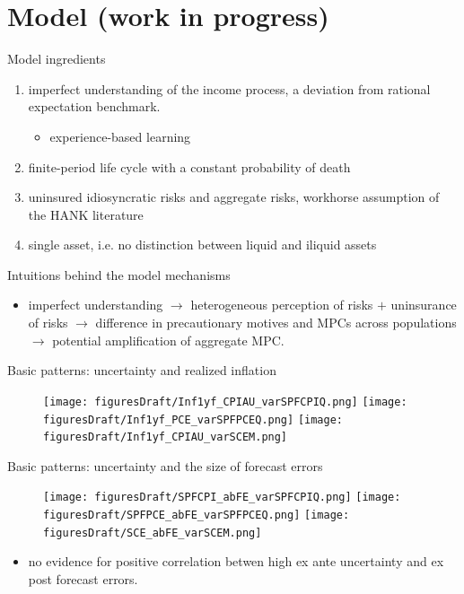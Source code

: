 \documentclass{beamer}
\begin{document}
\section{Model (work in progress)}

\begin{frame}{Model ingredients}

\begin{enumerate}
	\item imperfect understanding of the income process, a deviation from rational expectation benchmark. 
	\begin{itemize}
		\item experience-based learning 
	\end{itemize}
\item finite-period life cycle with a constant probability of death 
\item uninsured idiosyncratic risks and aggregate risks, workhorse assumption of the HANK literature
\item single asset, i.e. no distinction between liquid and iliquid assets 
\end{enumerate}
	
\end{frame}



\begin{frame}{Intuitions behind the model mechanisms}
	\begin{itemize}
		\item imperfect understanding $\rightarrow$ heterogeneous perception of risks $\plus$ uninsurance of risks $\rightarrow$ difference in precautionary motives and MPCs across populations $\rightarrow$ potential amplification of aggregate MPC. 
\end{itemize}
\end{frame}




\begin{frame}{Basic patterns: uncertainty and realized inflation}
	\begin{figure}
		\centering
		\label{InfVar}
		\texttt{[image: figuresDraft/Inf1yf\_CPIAU\_varSPFCPIQ.png]}
		\texttt{[image: figuresDraft/Inf1yf\_PCE\_varSPFPCEQ.png]}
		\texttt{[image: figuresDraft/Inf1yf\_CPIAU\_varSCEM.png]}
	\end{figure}
\end{frame}


\begin{frame}{Basic patterns: uncertainty and the size of forecast errors}
	\begin{figure}
		\centering
		\label{FEVar}
		\texttt{[image: figuresDraft/SPFCPI\_abFE\_varSPFCPIQ.png]}
		\texttt{[image: figuresDraft/SPFPCE\_abFE\_varSPFPCEQ.png]}
		\texttt{[image: figuresDraft/SCE\_abFE\_varSCEM.png]}
	\end{figure}
\begin{itemize}
\item no evidence for positive correlation betwen high ex ante uncertainty and ex post forecast errors.
\end{itemize}
\end{frame}
\end{document}
